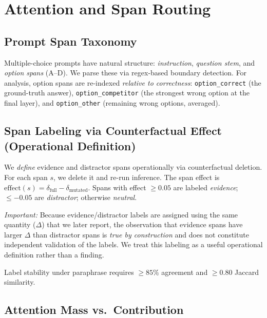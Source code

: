 \documentclass{article}
\begin{document}
\section{Attention and Span Routing}
\label{sec:routing}

\subsection{Prompt Span Taxonomy}

Multiple-choice prompts have natural structure: \emph{instruction}, \emph{question stem}, and \emph{option spans} (A--D).  We parse these via regex-based boundary detection.  For analysis, option spans are re-indexed \emph{relative to correctness}: \texttt{option\_correct} (the ground-truth answer), \texttt{option\_competitor} (the strongest wrong option at the final layer), and \texttt{option\_other} (remaining wrong options, averaged).

\subsection{Span Labeling via Counterfactual Effect (Operational Definition)}

We \emph{define} evidence and distractor spans operationally via counterfactual deletion.  For each span $s$, we delete it and re-run inference.  The span effect is $\mathrm{effect}(s) = \delta_{\mathrm{full}} - \delta_{\mathrm{mutated}}$.  Spans with effect $\geq 0.05$ are labeled \emph{evidence}; $\leq -0.05$ are \emph{distractor}; otherwise \emph{neutral}.

\emph{Important:} Because evidence/distractor labels are assigned using the same quantity ($\Delta$) that we later report, the observation that evidence spans have larger $\Delta$ than distractor spans is \emph{true by construction} and does not constitute independent validation of the labels.  We treat this labeling as a useful operational definition rather than a finding.

Label stability under paraphrase requires $\geq 85\%$ agreement and $\geq 0.80$ Jaccard similarity.

\subsection{Attention Mass vs.\ Contribution}
\end{document}
